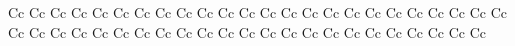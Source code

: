 \documentclass{worksheet}
\begin{document}
\begin{drillsheet}
\calligra
Cc Cc Cc Cc Cc Cc Cc Cc Cc Cc Cc Cc Cc Cc Cc Cc Cc Cc Cc Cc Cc Cc Cc Cc Cc Cc Cc Cc Cc Cc Cc Cc Cc Cc Cc Cc Cc Cc Cc Cc Cc Cc Cc Cc Cc Cc Cc
\end{drillsheet}
\end{document}
